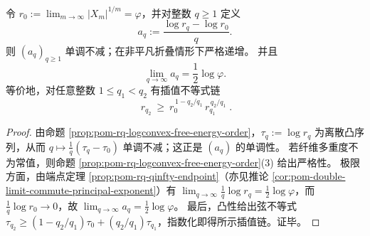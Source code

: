 \begin{corollary}[基态归一化凸序：以 \texorpdfstring{$r_0=\varphi$}{r0=phi} 为基准的自由能缺陷斜率单调性]\label{cor:pom-rq-groundstate-normalized-slope}
令
\(
r_0:=\lim_{m\to\infty}|X_m|^{1/m}=\varphi
\)，并对整数 \(q\ge 1\) 定义
\[
a_q:=\frac{\log r_q-\log r_0}{q}.
\]
则 \((a_q)_{q\ge 1}\) 单调不减；在非平凡折叠情形下严格递增。
并且
\[
\lim_{q\to\infty}a_q=\frac12\log\varphi.
\]
等价地，对任意整数 \(1\le q_1<q_2\) 有插值不等式链
\[
\boxed{\;
r_{q_2}\ \ge\ r_0^{\,1-q_2/q_1}\,r_{q_1}^{\,q_2/q_1}\; }.
\]
\end{corollary}
\begin{proof}
由命题 \ref{prop:pom-rq-logconvex-free-energy-order}，\(\tau_q:=\log r_q\) 为离散凸序列，从而 \(q\mapsto \frac{1}{q}(\tau_q-\tau_0)\) 单调不减；这正是 \((a_q)\) 的单调性。
若纤维多重度不为常值，则命题 \ref{prop:pom-rq-logconvex-free-energy-order}(3) 给出严格性。
极限方面，由端点定理 \ref{prop:pom-rq-qinfty-endpoint}（亦见推论 \ref{cor:pom-double-limit-commute-principal-exponent}）有 \(\lim_{q\to\infty}\frac{1}{q}\log r_q=\frac12\log\varphi\)，而 \(\frac{1}{q}\log r_0\to 0\)，故 \(\lim_{q\to\infty}a_q=\frac12\log\varphi\)。
最后，凸性给出弦不等式
\(
\tau_{q_2}\ge (1-q_2/q_1)\tau_0+(q_2/q_1)\tau_{q_1}
\)，指数化即得所示插值链。证毕。
\end{proof}
